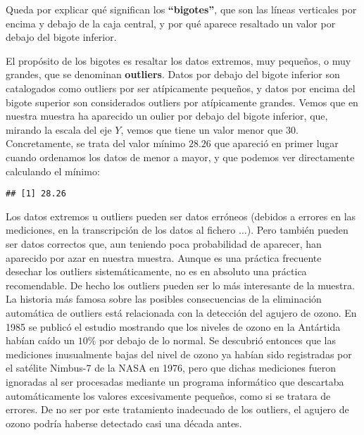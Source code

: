 \documentclass[
  degree=mecinf,
  title=normal,
  toc=normal,
  bib=normal]{mnye}
\newenvironment{Shaded}{\begin{snugshade}}{\end{snugshade}}
\newcommand{\FunctionTok}[1]{\textcolor[rgb]{0.00,0.00,0.00}{#1}}
\newcommand{\NormalTok}[1]{#1}
\newcommand{\SpecialCharTok}[1]{\textcolor[rgb]{0.00,0.00,0.00}{#1}}
\begin{document}
Queda por explicar qué significan los \textbf{``bigotes''}, que son las líneas verticales por encima y debajo de la caja central, y por qué aparece resaltado un valor por debajo del bigote inferior.

El propósito de los bigotes es resaltar los datos extremos, muy pequeños, o muy grandes, que se denominan \textbf{outliers}. Datos por debajo del bigote inferior son catalogados como outliers por ser atípicamente pequeños, y datos por encima del bigote superior son considerados outliers por atípicamente grandes. Vemos que en nuestra muestra ha aparecido un oulier por debajo del bigote inferior, que, mirando la escala del eje \(Y\), vemos que tiene un valor menor que \(30\). Concretamente, se trata del valor mínimo \(28.26\) que apareció en primer lugar cuando ordenamos los datos de menor a mayor, y que podemos ver directamente calculando el mínimo:

\begin{Shaded}
\end{Shaded}

\begin{verbatim}
## [1] 28.26
\end{verbatim}

Los datos extremos u outliers pueden ser datos erróneos (debidos a errores en las mediciones, en la transcripción de los datos al fichero \(\dotsc\)). Pero también pueden ser datos correctos que, aun teniendo poca probabilidad de aparecer, han aparecido por azar en nuestra muestra. Aunque es una práctica frecuente desechar los outliers sistemáticamente, no es en absoluto una práctica recomendable. De hecho los outliers pueden ser lo más interesante de la muestra. La historia más famosa sobre las posibles consecuencias de la eliminación automática de outliers está relacionada con la detección del agujero de ozono. En 1985 se publicó el estudio mostrando que los niveles de ozono en la Antártida habían caído un \(10\%\) por debajo de lo normal. Se descubrió entonces que las mediciones inusualmente bajas del nivel de ozono ya habían sido registradas por el satélite Nimbus-7 de la NASA en 1976, pero que dichas mediciones fueron ignoradas al ser procesadas mediante un programa informático que descartaba automáticamente los valores excesivamente pequeños, como si se tratara de errores. De no ser por este tratamiento inadecuado de los outliers, el agujero de ozono podría haberse detectado casi una década antes.
\end{document}
